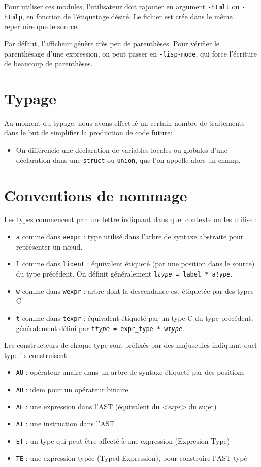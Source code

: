 \documentclass[a4paper]{article}
\begin{document}
Pour utiliser ces modules, l'utilisateur doit rajouter en argument
\texttt{-htmlt} ou \texttt{-htmlp}, en fonction de l'étiquetage désiré.
Le fichier est crée dans le même repertoire que le source.

Par défaut, l'afficheur génère très peu de parenthèses.
Pour vérifier le parenthésage d'une expression, on peut passer en \texttt{-lisp-mode}, qui force l'écriture de beaucoup de parenthèses.

\section{Typage}

Au moment du typage, nous avons effectué un certain nombre de traitements
dans le but de simplifier la production de code future:
\begin{itemize}
\item On différencie une déclaration de variables locales ou globales d'une
déclaration dans une \texttt{struct} ou \texttt{union}, que l'on appelle
alors un champ.

\end{itemize}

\appendix
\section{Conventions de nommage}

Les types commencent par une lettre indiquant dans quel contexte on les utilise :
\begin{itemize}
    \item \texttt{a} comme dans \texttt{aexpr} : type utilisé dans l'arbre de syntaxe abstraite pour représenter un nœud.
    \item \texttt{l} comme dans \texttt{lident} : équivalent étiqueté (par une position dans le source) du type précédent.
    On définit généralement \texttt{l\emph{type} = label * a\emph{type}}.
\item \texttt{w} comme dans \texttt{wexpr} : arbre dont la descendance est étiquetée par des types C
\item \texttt{t} comme dans \texttt{texpr} : équivalent étiqueté par un type C du type précédent, généralement défini par \texttt{t\emph{type} = expr\_type * w\emph{type}}.
\end{itemize}

Les constructeurs de chaque type sont préfixés par des majuscules indiquant quel type ils construisent :
\begin{itemize}
    \item \texttt{AU} : opérateur unaire dans un arbre de syntaxe étiqueté par des positions
    \item \texttt{AB} : idem pour un opérateur binaire
    \item \texttt{AE} : une expression dans l'AST (équivalent du \emph{<expr>} du sujet)
    \item \texttt{AI} : une instruction dans l'AST
    \item \texttt{ET} : un type qui peut être affecté à une expression (Expresion Type)
    \item \texttt{TE} : une expression typée (Typed Expression), pour construire l'AST typé
\end{itemize}
\end{document}
